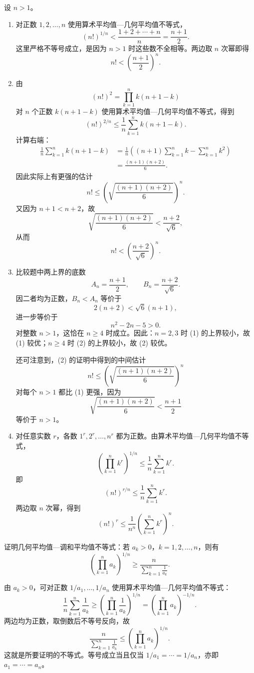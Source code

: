 \begin{xsolution}
设 $n>1$。
\begin{enumerate}[label=(\arabic*)]
  \item 对正数 $1,2,\ldots,n$ 使用算术平均值—几何平均值不等式，
  \[
    (n!)^{1/n}
    <\frac{1+2+\cdots+n}{n}
    =\frac{n+1}{2}.
  \]
  这里严格不等号成立，是因为 $n>1$ 时这些数不全相等。两边取 $n$ 次幂即得
  \[
    n!<\left(\frac{n+1}{2}\right)^n.
  \]

  \item 由
  \[
    (n!)^2=\prod_{k=1}^n k(n+1-k)
  \]
  对 $n$ 个正数 $k(n+1-k)$ 使用算术平均值—几何平均值不等式，得到
  \[
    (n!)^{2/n}
    \le\frac1n\sum_{k=1}^n k(n+1-k).
  \]
  计算右端：
  \[
  \begin{aligned}
    \frac1n\sum_{k=1}^n k(n+1-k)
    &=\frac1n\left((n+1)\sum_{k=1}^n k-\sum_{k=1}^n k^2\right)\\
    &=\frac{(n+1)(n+2)}6.
  \end{aligned}
  \]
  因此实际上有更强的估计
  \[
    n!\le\left(\sqrt{\frac{(n+1)(n+2)}6}\right)^n.
  \]
  又因为 $n+1<n+2$，故
  \[
    \sqrt{\frac{(n+1)(n+2)}6}<\frac{n+2}{\sqrt6},
  \]
  从而
  \[
    n!<\left(\frac{n+2}{\sqrt6}\right)^n.
  \]

  \item 比较题中两上界的底数
  \[
    A_n=\frac{n+1}{2},\qquad B_n=\frac{n+2}{\sqrt6}.
  \]
  因二者均为正数，$B_n<A_n$ 等价于
  \[
    2(n+2)<\sqrt6(n+1),
  \]
  进一步等价于
  \[
    n^2-2n-5>0.
  \]
  对整数 $n>1$，这恰在 $n\ge4$ 时成立。因此：$n=2,3$ 时 (1) 的上界较小，故 (1) 较优；$n\ge4$ 时 (2) 的上界较小，故 (2) 较优。

  还可注意到，(2) 的证明中得到的中间估计
  \[
    n!\le\left(\sqrt{\frac{(n+1)(n+2)}6}\right)^n
  \]
  对每个 $n>1$ 都比 (1) 更强，因为
  \[
    \sqrt{\frac{(n+1)(n+2)}6}<\frac{n+1}{2}
  \]
  等价于 $n>1$。

  \item 对任意实数 $r$，各数 $1^r,2^r,\ldots,n^r$ 都为正数。由算术平均值—几何平均值不等式，
  \[
    \left(\prod_{k=1}^n k^r\right)^{1/n}
    \le\frac1n\sum_{k=1}^n k^r.
  \]
  即
  \[
    (n!)^{r/n}\le\frac1n\sum_{k=1}^n k^r.
  \]
  两边取 $n$ 次幂，得到
  \[
    (n!)^r\le\frac1{n^n}\left(\sum_{k=1}^n k^r\right)^n.
  \]
\end{enumerate}
\end{xsolution}


\begin{xexercise}[3]
证明几何平均值—调和平均值不等式：若 $a_k>0$，$k=1,2,\ldots,n$，则有
\[
  \left(\prod_{k=1}^n a_k\right)^{1/n}
  \ge
  \frac{n}{\displaystyle\sum_{k=1}^n\frac1{a_k}}.
\]
\end{xexercise}
\begin{xsolution}
由 $a_k>0$，可对正数 $1/a_1,\ldots,1/a_n$ 使用算术平均值—几何平均值不等式：
\[
  \frac1n\sum_{k=1}^n\frac1{a_k}
  \ge
  \left(\prod_{k=1}^n\frac1{a_k}\right)^{1/n}
  =\left(\prod_{k=1}^n a_k\right)^{-1/n}.
\]
两边均为正数，取倒数后不等号反向，故
\[
  \frac{n}{\displaystyle\sum_{k=1}^n\frac1{a_k}}
  \le
  \left(\prod_{k=1}^n a_k\right)^{1/n}.
\]
这就是所要证明的不等式。等号成立当且仅当 $1/a_1=\cdots=1/a_n$，亦即 $a_1=\cdots=a_n$。
\end{xsolution}


